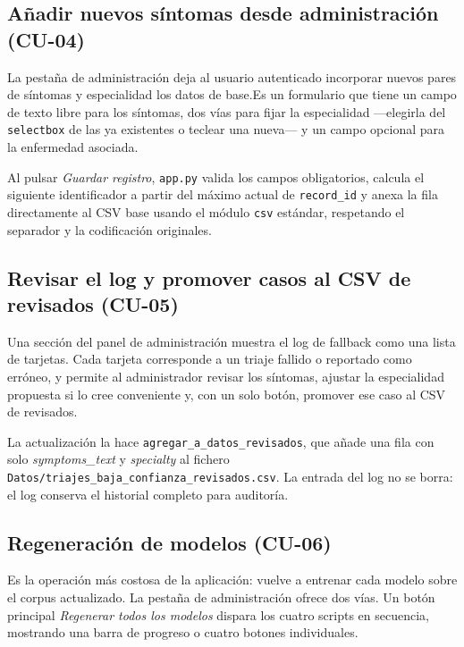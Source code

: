 \subsection*{Añadir nuevos síntomas desde administración (CU-04)}

La pestaña de administración deja al usuario autenticado incorporar nuevos pares de síntomas y especialidad los datos de base.Es un formulario que tiene un campo de texto libre para los síntomas, dos vías para fijar la especialidad ---elegirla del \texttt{selectbox} de las ya existentes o teclear una nueva--- y un campo opcional para la enfermedad asociada.


Al pulsar \textit{Guardar registro}, \texttt{app.py} valida los campos obligatorios, calcula el siguiente identificador a partir del máximo actual de \texttt{record\_id} y anexa la fila directamente al CSV base usando el módulo \texttt{csv} estándar, respetando el separador y la codificación originales. 

\subsection*{Revisar el log y promover casos al CSV de revisados (CU-05)}

Una sección del panel de administración muestra el log de fallback como una lista de tarjetas. Cada tarjeta corresponde a un triaje fallido o reportado como erróneo, y permite al administrador revisar los síntomas, ajustar la especialidad propuesta si lo cree conveniente y, con un solo botón, promover ese caso al CSV de revisados.


La actualización la hace \texttt{agregar\_a\_datos\_revisados}, que añade una fila con solo \textit{symptoms\_text} y \textit{specialty} al fichero \texttt{Datos/triajes\_baja\_confianza\_re\-visados.csv}. La entrada del log no se borra: el log conserva el historial completo para auditoría.

\subsection*{Regeneración de modelos (CU-06)}

Es la operación más costosa de la aplicación: vuelve a entrenar cada modelo sobre el corpus actualizado. La pestaña de administración ofrece dos vías. Un botón principal \textit{Regenerar todos los modelos} dispara los cuatro scripts en secuencia, mostrando una barra de progreso o cuatro botones individuales.

